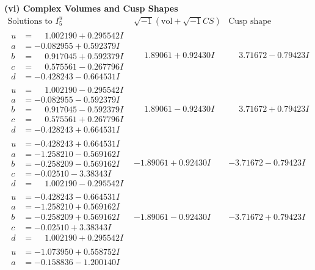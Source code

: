 \documentclass[1p]{elsarticle_modified}
\theoremstyle{definition}
\newcommand{\I}{\sqrt{-1}}
\begin{document}
\newpage\flushleft \textbf{(vi) Complex Volumes and Cusp Shapes}
$$\begin{array}{c|c|c}  
\text{Solutions to }I^u_{5}& \I (\text{vol} + \sqrt{-1}CS) & \text{Cusp shape}\\
 \hline 
\begin{aligned}
u &= \phantom{-}1.002190 + 0.295542 I \\
a &= -0.082955 + 0.592379 I \\
b &= \phantom{-}0.917045 + 0.592379 I \\
c &= \phantom{-}0.575561 - 0.267796 I \\
d &= -0.428243 - 0.664531 I\end{aligned}
 & \phantom{-}1.89061 + 0.92430 I & \phantom{-}3.71672 - 0.79423 I \\ \hline\begin{aligned}
u &= \phantom{-}1.002190 - 0.295542 I \\
a &= -0.082955 - 0.592379 I \\
b &= \phantom{-}0.917045 - 0.592379 I \\
c &= \phantom{-}0.575561 + 0.267796 I \\
d &= -0.428243 + 0.664531 I\end{aligned}
 & \phantom{-}1.89061 - 0.92430 I & \phantom{-}3.71672 + 0.79423 I \\ \hline\begin{aligned}
u &= -0.428243 + 0.664531 I \\
a &= -1.258210 - 0.569162 I \\
b &= -0.258209 - 0.569162 I \\
c &= -0.02510 - 3.38343 I \\
d &= \phantom{-}1.002190 - 0.295542 I\end{aligned}
 & -1.89061 + 0.92430 I & -3.71672 - 0.79423 I \\ \hline\begin{aligned}
u &= -0.428243 - 0.664531 I \\
a &= -1.258210 + 0.569162 I \\
b &= -0.258209 + 0.569162 I \\
c &= -0.02510 + 3.38343 I \\
d &= \phantom{-}1.002190 + 0.295542 I\end{aligned}
 & -1.89061 - 0.92430 I & -3.71672 + 0.79423 I \\ \hline\begin{aligned}
u &= -1.073950 + 0.558752 I \\
a &= -0.158836 - 1.200140 I \\

\end{aligned}
\end{array}$$
\end{document}
